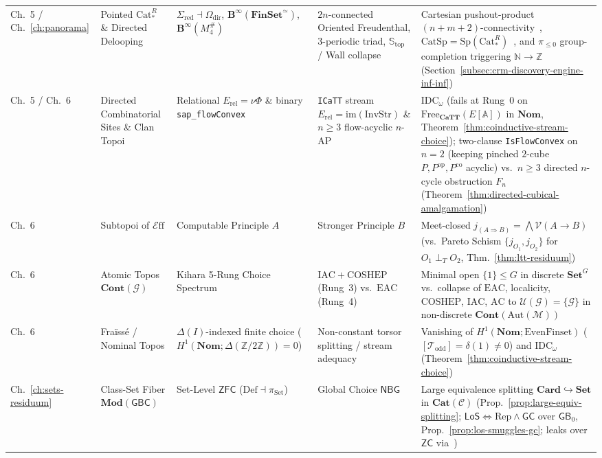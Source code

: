 \documentclass[10pt,twoside,openright]{book}
\theoremstyle{crmplain}
\theoremstyle{crmdef}
\theoremstyle{crmremark}
\newcommand{\Eff}{\mathcal{E}\mathrm{ff}}
\begin{document}
{\begin{xltabular}{\textwidth}{@{}P{0.11\textwidth}P{0.17\textwidth}P{0.18\textwidth}P{0.18\textwidth}Y@{}}
Ch.~5 / Ch.~\ref{ch:panorama} & Pointed $\mathrm{Cat}^R_*$ \& Directed Delooping & $\Sigma_{\mathrm{red}} \dashv \Omega_{\mathrm{dir}}$, $\mathbf{B}^\infty(\mathbf{FinSet}^{\simeq})$, $\mathbf{B}^\infty(M_4^\#)$ & $2n$-connected Oriented Freudenthal, 3-periodic triad, $\mathbb{S}_{\mathrm{top}}$ / Wall collapse & Cartesian pushout-product $(n+m+2)$-connectivity~\cite{Geiss26}, $\mathrm{CatSp} = \mathrm{Sp}(\mathrm{Cat}^R_*)$~\cite{Masuda26}, and $\pi_{\le 0}$ group-completion triggering $\mathbb{N} \to \mathbb{Z}$ (Section~\ref{subsec:crm-discovery-engine-inf-inf}) \\
Ch.~5 / Ch.~6 & Directed Combinatorial Sites \& Clan Topoi & Relational $E_{\mathrm{rel}} = \nu\Phi$ \& binary \texttt{sap\_\allowbreak flowConvex} & \texttt{ICaTT} stream $E_{\mathrm{rel}} = \mathrm{im}(\mathrm{InvStr})$ \& $n \ge 3$ flow-acyclic $n$-AP & $\mathrm{IDC}_\omega$ (fails at Rung~0 on $\mathrm{Free}_{\mathbf{CaTT}}(E[\mathbb{A}])$ in $\mathbf{Nom}$, Theorem~\ref{thm:coinductive-stream-choice}); two-clause \texttt{IsFlowConvex} on $n=2$ (keeping pinched $2$-cube $P, P^{\mathrm{op}}, P^{\mathrm{co}}$ acyclic) vs.\ $n \ge 3$ directed $n$-cycle obstruction $F_n$ (Theorem~\ref{thm:directed-cubical-amalgamation}) \\
Ch.~6 & Subtopoi of $\Eff$ & Computable Principle $A$ & Stronger Principle $B$ & Meet-closed $j_{(A \Rightarrow B)} = \bigwedge \mathcal{V}(A \to B)$ (vs.\ Pareto Schism $\{j_{O_1}, j_{O_2}\}$ for $O_1 \perp_T O_2$, Thm.~\ref{thm:ltt-residuum}) \\
Ch.~6 & Atomic Topos $\mathbf{Cont}(\mathcal{G})$ & Kihara 5-Rung Choice Spectrum~\cite{Kihara26} & $\mathrm{IAC} + \mathrm{COSHEP}$ (Rung~3) vs.\ $\mathrm{EAC}$ (Rung~4) & Minimal open $\{1\} \le G$ in discrete $\mathbf{Set}^G$ vs.\ collapse of $\mathrm{EAC}$, localicity, $\mathrm{COSHEP}$, $\mathrm{IAC}$, $\mathrm{AC}$ to $\mathcal{U}(\mathcal{G}) = \{\mathcal{G}\}$ in non-discrete $\mathbf{Cont}(\mathrm{Aut}(\mathcal{M}))$ \\
Ch.~6 & Fraïssé / Nominal Topos & $\Delta(I)$-indexed finite choice ($H^1(\mathbf{Nom};\allowbreak \Delta(\mathbb{Z}/2\mathbb{Z})) = 0$) & Non-constant torsor splitting / stream adequacy & Vanishing of $H^1(\mathbf{Nom}; \mathrm{EvenFinset})$ ($[\mathcal{T}_{\mathrm{odd}}] = \delta(1) \neq 0$) and $\mathrm{IDC}_\omega$ (Theorem~\ref{thm:coinductive-stream-choice}) \\
Ch.~\ref{ch:sets-residuum} & Class-Set Fiber $\mathbf{Mod}(\mathsf{GBC})$ & Set-Level $\mathsf{ZFC}$ ($\mathrm{Def} \dashv \pi_{\mathrm{Set}}$) & Global Choice $\mathsf{NBG}$ & Large equivalence splitting $\mathbf{Card} \hookrightarrow \mathbf{Set}$ in $\mathbf{Cat}(\mathcal{C})$ (Prop.~\ref{prop:large-equiv-splitting}; $\mathsf{LoS} \iff \mathrm{Rep} \wedge \mathsf{GC}$ over $\mathsf{GB}_0$, Prop.~\ref{prop:los-smuggles-gc}; leaks over $\mathsf{ZC}$ via~\cite{Glazer23}) \\

\end{xltabular}}
\end{document}
